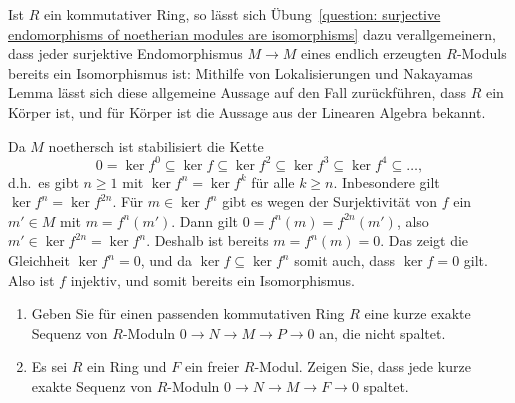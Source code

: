 \begin{remark*}
  Ist $R$ ein kommutativer Ring, so lässt sich Übung~\ref{question: surjective endomorphisms of noetherian modules are isomorphisms} dazu verallgemeinern, dass jeder surjektive Endomorphismus $M \to M$ eines endlich erzeugten $R$-Moduls bereits ein Isomorphismus ist:
  Mithilfe von Lokalisierungen und Nakayamas Lemma lässt sich diese allgemeine Aussage auf den Fall zurückführen, dass $R$ ein Körper ist, und für Körper ist die Aussage aus der Linearen Algebra bekannt.
\end{remark*}


\begin{solution}
  Da $M$ noethersch ist stabilisiert die Kette
  \[
              0
    =         \ker f^0
    \subseteq \ker f
    \subseteq \ker f^2
    \subseteq \ker f^3
    \subseteq \ker f^4
    \subseteq \dotso,
  \]
  d.h.\ es gibt $n \geq 1$ mit $\ker f^n = \ker f^k$ für alle $k \geq n$.
  Inbesondere gilt $\ker f^n = \ker f^{2n}$.
  Für $m \in \ker f^n$ gibt es wegen der Surjektivität von $f$ ein $m' \in M$ mit $m = f^n(m')$.
  Dann gilt $0 = f^n(m) = f^{2n}(m')$, also $m' \in \ker f^{2n} = \ker f^n$.
  Deshalb ist bereits $m = f^n(m) = 0$.
  Das zeigt die Gleichheit $\ker f^n = 0$, und da $\ker f \subseteq \ker f^n$ somit auch, dass $\ker f = 0$ gilt.
  Also ist $f$ injektiv, und somit bereits ein Isomorphismus.
\end{solution}


\begin{question}
  \begin{enumerate}
    \item
      Geben Sie für einen passenden kommutativen Ring $R$ eine kurze exakte Sequenz von $R$-Moduln $0 \to N \to M \to P \to 0$ an, die nicht spaltet.
    \item
      Es sei $R$ ein Ring und $F$ ein freier $R$-Modul.
      Zeigen Sie, dass jede kurze exakte Sequenz von $R$-Moduln $0 \to N \to M \to F \to 0$ spaltet.
  \end{enumerate}
\end{question}


